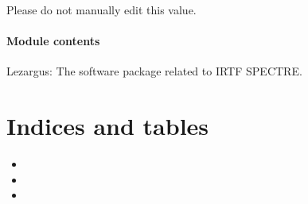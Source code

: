 \documentclass[letterpaper,11pt,english]{sphinxmanual}
\begin{document}
\sphinxAtStartPar
Please do not manually edit this value.


\subsubsection{Module contents}
\label{\detokenize{code/lezargus:module-lezargus}}\label{\detokenize{code/lezargus:module-contents}}
\sphinxAtStartPar
Lezargus: The software package related to IRTF SPECTRE.


\chapter{Indices and tables}
\label{\detokenize{index:indices-and-tables}}\begin{itemize}
\item {} 
\sphinxAtStartPar
{}

\item {} 
\sphinxAtStartPar
{}

\item {} 
\sphinxAtStartPar
{}

\end{itemize}
\end{document}
